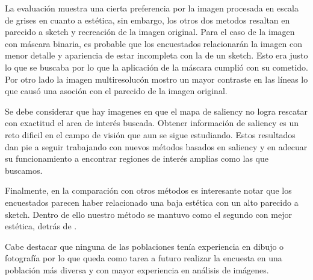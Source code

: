 \documentclass[letterpaper, 10 pt, conference]{ieeeconf}  %
\begin{document}
La evaluación muestra una cierta preferencia por la imagen procesada en escala de grises en cuanto a estética, sin embargo, los otros dos metodos resaltan en parecido a sketch y recreación de la imagen original. Para el caso de la imagen con máscara binaria, es probable que los encuestados relacionarán la imagen con menor detalle y apariencia de estar incompleta con la de un sketch. Esto era justo lo que se buscaba por lo que la aplicación de la máscara cumplió con su cometido.
Por otro lado la imagen multiresolucón mostro un mayor contraste en las líneas lo que causó una asoción con el parecido de la imagen original.

Se debe considerar que hay imagenes en que el mapa de saliency no logra rescatar con exactitud el area de interés buscada. Obtener información de saliency es un reto dificil en el campo de visión que aun se sigue estudiando. Estos resultados dan pie a seguir trabajando con nuevos métodos basados en saliency y en adecuar su funcionamiento a encontrar regiones de interés amplias como las que buscamos.

Finalmente, en la comparación con otros métodos es interesante notar que los encuestados parecen haber relacionado una baja estética con un alto parecido a sketch. Dentro de ello nuestro método se mantuvo como el segundo con mejor estética, detrás de \cite{lu}. 

Cabe destacar que ninguna de las poblaciones tenía experiencia en dibujo o fotografía por lo que queda como tarea a futuro realizar la encuesta en una población más diversa y con mayor experiencia en análisis de imágenes.


\addtolength{\textheight}{-12cm}   %







\end{document}
